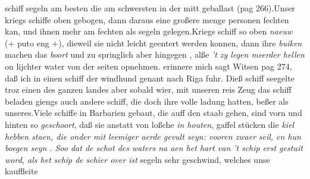  schiff\protect{} segeln am besten die am schwersten in der mitt geballast (pag 266).\pend \pstart Unser kriegs schiffe\protect{} oben gebogen, dann daraus eine großere menge personen fechten kan, und ihnen mehr am fechten als segeln\protect{} gelegen.\pend \pstart Kriegs schiff\protect{} so oben \textit{naeuw} (+ puto eng +), dieweil sie nicht leicht geentert werden konnen, dann ihre  \textit{buiken} machen das \textit{boort} und zu springlich aber hingegen , alße  \textit{'t zy legen meerder hellen} on lijchter water von der seiten opnehmen.\pend \pstart {} erinnere mich sagt Witsen\protect{} pag 274, daß ich in einen schiff\protect{} der windhund genant nach Riga\protect{} fuhr. Dieß schiff\protect{} seegelte troz einen des ganzen landes aber sobald wier, mit unseren reis Zeug das schiff\protect{} beladen giengs auch andere schiff\protect{}, die doch ihre volle ladung hatten, beßer als unseres.\pend \pstart Viele schiffe\protect{} in Barbarien\protect{} gebaut, die auff den staab gehen, sind vorn und hinten so \textit{geschoort}, daß sie anstatt von loßche \textit{in houten}, gaffel st\"{u}cken   die \textit{kiel}\protect{}\textit{ hebben staen, die onder mit leemiger aerde gevult seyn: vooren zwaer }\textit{seil}\protect{}\textit{, en hun boegen seyn }\textit{. Soo dat de schot des waters na aen het hart van 't }\textit{schip}\protect{}\textit{ erst gestuit word, als het }\textit{schip}\protect{}\textit{ de }\textit{ schier over ist}  segeln sehr geschwind, welches unse kauffleite 